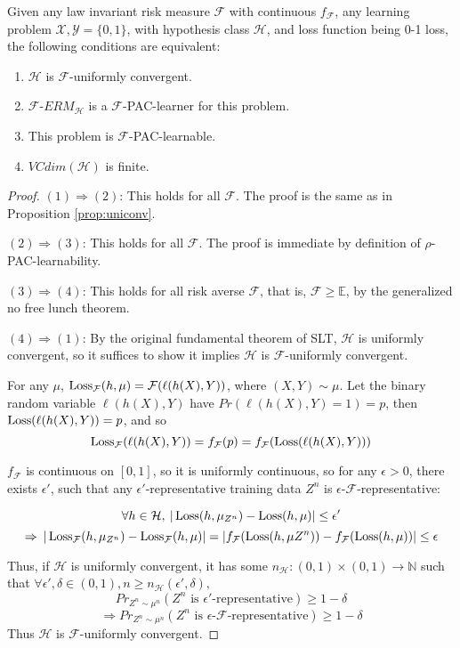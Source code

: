 \begin{theorem}
	\label{theorem:funtheo_slt_2}
Given any law invariant risk measure $\mathcal{F}$ with continuous $f_\mathcal{F}$, any learning problem $\mathcal{X}, \mathcal{Y} = \{0, 1\}$, with hypothesis class $\mathcal{H}$, and loss function being 0-1 loss, the following conditions are equivalent:
	\begin{enumerate}[(1)]
		\item $\mathcal{H}$ is $\mathcal{F}$-uniformly convergent. 
		\item $\mathcal{F}$-$ERM_{\mathcal{H}}$ is a $\mathcal{F}$-PAC-learner for this problem.
		\item This problem is $\mathcal{F}$-PAC-learnable.
		\item $VCdim(\mathcal{H})$ is finite.
	\end{enumerate}
\end{theorem}
\begin{proof}
$(1) \Rightarrow (2)$: This holds for all $\mathcal{F}$. The proof is the same as in Proposition \ref{prop:uniconv}.

$(2) \Rightarrow (3)$: This holds for all $\mathcal{F}$. The proof is immediate by definition of $\rho$-PAC-learnability.

$(3) \Rightarrow (4)$: This holds for all risk averse $\mathcal{F}$, that is, $\mathcal{F} \ge \mathbb{E}$, by the generalized no free lunch theorem.


$(4) \Rightarrow (1)$: By the original fundamental theorem of SLT, $\mathcal{H}$ is uniformly convergent, so it suffices to show it implies $\mathcal{H}$ is $\mathcal{F}$-uniformly convergent.

For any $\mu$, $\operatorname{Loss}_\mathcal{F}(h, \mu) = \mathcal{F}(\ell(h(X), Y))$, where $(X, Y) \sim \mu$. Let the binary random variable $\ell(h(X), Y)$ have $Pr(\ell(h(X), Y) = 1) = p$, then $\operatorname{Loss}(\ell(h(X), Y)) = p$, and so 
$$\operatorname{Loss}_\mathcal{F}(\ell(h(X), Y)) = f_\mathcal{F}(p) = f_\mathcal{F}(\operatorname{Loss}(\ell(h(X), Y)))$$

$f_\mathcal{F}$ is continuous on $[0, 1]$, so it is uniformly continuous, so for any $\epsilon>0$, there exists $\epsilon'$, such that any $\epsilon'$-representative training data $Z^n$ is $\epsilon$-$\mathcal{F}$-representative:

$$\forall h \in\mathcal{H}, \: |\operatorname{Loss}(h, \mu_{Z^n}) - \operatorname{Loss}(h, \mu)| \le \epsilon'$$ 
$$\Rightarrow \: |\operatorname{Loss}_\mathcal{F}(h, \mu_{Z^n}) - \operatorname{Loss}_\mathcal{F}(h, \mu)| = |f_\mathcal{F}(\operatorname{Loss}(h, \mu{Z^n})) - f_\mathcal{F}(\operatorname{Loss}(h, \mu))| \le \epsilon$$

Thus, if $\mathcal{H}$ is uniformly convergent, it has some $n_\mathcal{H}: (0, 1)\times (0, 1) \to \mathbb{N}$ such that $\forall \epsilon', \delta \in (0, 1), n \ge n_\mathcal{H}(\epsilon', \delta), $
$$Pr_{Z^n\sim \mu^n}(Z^n \text{ is }\epsilon'\text{-representative}) \ge 1-\delta$$
$$\Rightarrow Pr_{Z^n\sim \mu^n}(Z^n \text{ is }\epsilon\text{-}\mathcal{F}\text{-representative}) \ge 1-\delta$$
Thus $\mathcal{H}$ is $\mathcal{F}$-uniformly convergent.
\end{proof}


